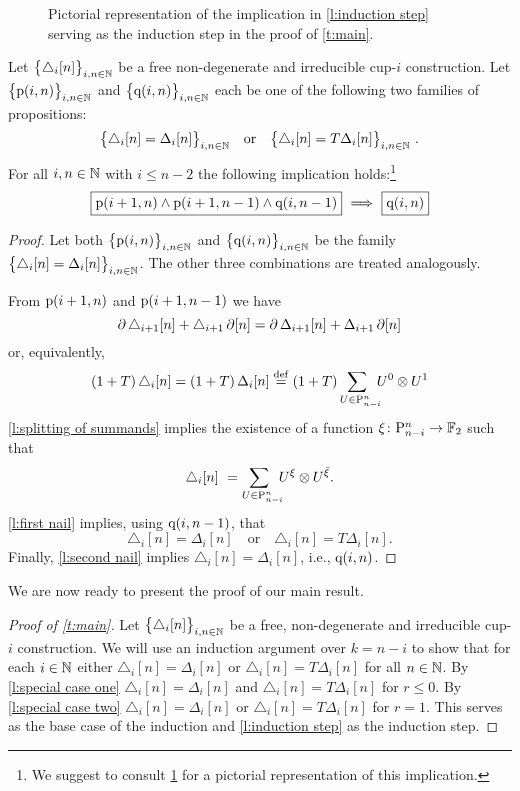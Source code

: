\begin{figure}
	\centering
	
	\caption{Pictorial representation of the implication in \cref{l:induction step} serving as the induction step in the proof of \cref{t:main}.}
	\label{f:induction step}
\end{figure}

\begin{lemma} \label{l:induction step}
	Let $\big\{ \triangle_i [n] \big\}_{i,n\in\mathbb{N}}$ be a free non-degenerate and irreducible \mbox{cup-$i$} construction.
	Let $\big\{ \mathrm{p}(i,n) \big\}_{i,n \in \mathbb{N}}$ and $\big\{ \mathrm{q}(i,n) \big\}_{i,n \in \mathbb{N}}$ each be one of the following two families of propositions:
	\[
	\big\{ \triangle_i [n] = \Delta_ i [n] \big\}_{i,n\in\N}
	\quad \text{or} \quad
	\big\{ \triangle_i [n] = T \Delta_ i [n] \big\}_{i,n\in\N} \ .
	\]
	For all $i,n \in \mathbb{N}$ with $i \leq n-2$ the following implication holds:\footnote{We suggest to consult \cref{f:induction step} for a pictorial representation of this implication.}
	\[
	\boxed{\mathrm{p}(i+1,n) \wedge \mathrm{p}(i+1,n-1) \wedge \mathrm{q}(i,n-1)}\ \Longrightarrow\ \boxed{\mathrm{q}(i,n)}
	\]
\end{lemma}

\begin{proof}
	Let both $\big\{ \mathrm{p}(i,n) \big\}_{i,n\in\mathbb{N}}$ and $\big\{ \mathrm{q}(i,n) \big\}_{i,n\in\mathbb{N}}$ be the family $\big\{ \triangle_i [n] = \Delta_i [n] \big\}_{i,n \in \mathbb{N}}$.
	The other three combinations are treated analogously.

	From $\mathrm{p}(i+1,n)$ and $\mathrm{p}(i+1,n-1)$ we have
	\[
	\operatorname{\partial} \triangle_{i+1} [n] + \triangle_{i+1} \operatorname{\partial} [n] = \operatorname{\partial} \Delta_{i+1} [n] + \Delta_{i+1} \operatorname{\partial} [n]
	\]
	or, equivalently,
	\begin{align*}
	(1+T) \, \triangle_i [n] =
	(1+T) \, \Delta_i [n] \stackrel{\mathrm{def}}{=}
	(1+T) \sum_{U \in \mathrm{P}_{n-i}^n \kern-5pt} {U^0} \otimes {U^1}
	\end{align*}
	\cref{l:splitting of summands} implies the existence of a function $\xi \colon \mathrm{P}_{n-i}^n \to {\mathbb{F}_2}$ such that
	\[
	\triangle_i [n] \ =
	\sum_{U \in \mathrm{P}_{n-i}^n \kern-5pt} U^\xi \otimes U^{\bar{\xi}}.
	\]
	\cref{l:first nail} implies, using $\mathrm{q}(i,n-1)$, that
	\[
	\triangle_i [n] = \Delta_i [n]
	\quad \text{or} \quad
	\triangle_i [n] = T \Delta_i [n].
	\]
	Finally, \cref{l:second nail} implies $\triangle_i [n] = \Delta_i [n]$, i.e., $\mathrm{q}(i,n)$.
\end{proof}

We are now ready to present the proof of our main result.

\begin{proof}[Proof of \cref{t:main}]
	Let $\big\{ \triangle_i [n] \big\}_{i,n\in\mathbb{N}}$ be a free, non-degenerate and irreducible \mbox{cup-$i$} construction.
	We will use an induction argument over $k = n-i$ to show that for each $i \in \mathbb{N}$ either $\triangle_i [n] = \Delta_i [n]$ or
	$\triangle_i [n] = T \Delta_i [n]$ for all $n \in \mathbb{N}$.
	By \cref{l:special case one} $\triangle_i [n] = \Delta_i [n]$ and $\triangle_i [n] = T \Delta_i [n]$ for $r \leq 0$.
	By \cref{l:special case two} $\triangle_i [n] = \Delta_i [n]$ or $\triangle_i [n] = T \Delta_i [n]$ for $r = 1$.
	This serves as the base case of the induction and \cref{l:induction step} as the induction step.
\end{proof}